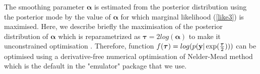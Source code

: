 \documentclass[12pt,titlepage]{report}
\newcommand{\by}{{\bf y}}
\newcommand{\btau}{{{\boldsymbol{\tau}}}}
\theoremstyle{definition}
\theoremstyle{remark}
\begin{document}
The smoothing parameter $\boldsymbol{\alpha}$ is estimated from the posterior distribution using the posterior mode by the value of $\boldsymbol{\alpha}$ for which marginal likelihood (\ref{like3}) is maximised. Here, we describe briefly the maximisation of the posterior distribution of $\boldsymbol{\alpha}$ which is reparametrized as $\btau=2log(\boldsymbol{\alpha})$ to make it unconstrained optimisation \citep{pd7, pd5}. 
Therefore, function $f(\btau)=log(p(\by|\exp(\frac{\btau}{2})))$ can be optimised using a derivative-free numerical optimisation of Nelder-Mead method which is the default in the "emulator" package that we use.
\end{document}
